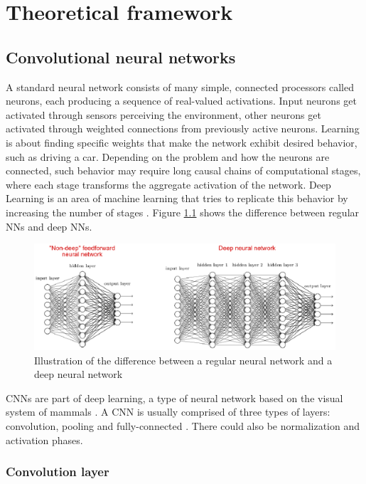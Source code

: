 \chapter{Theoretical framework}
\label{ch:marco}

\section{Convolutional neural networks}

A standard neural network consists of many simple, connected processors called neurons,
each producing a sequence of real-valued activations. Input neurons get activated through 
sensors perceiving the environment, other neurons get activated through weighted connections from previously
active neurons.
Learning is about finding specific weights that make the network exhibit desired behavior,
such as driving a car. Depending on the problem and how the neurons are connected, such behavior
may require long causal chains of computational stages, where each stage transforms 
the aggregate activation of the network. Deep Learning is an area of machine learning that tries to
replicate this behavior by increasing the number of stages \cite{schmidhuber2015deep}.
Figure \ref{fig:nnvscnn} shows the difference between regular NNs and deep NNs.

\begin{figure}
  \includegraphics[width=\linewidth]{fig/nnvscnn.eps}
  \caption{Illustration of the difference between a regular neural network and a deep neural network \cite{nielsen2015neural}}
  \label{fig:nnvscnn}
\end{figure}

CNNs are part of deep learning, a type of neural network based on the 
visual system of mammals \cite{fukushima1980neocognitron}\cite{hubel1968receptive}.
A CNN is usually comprised of three types of layers: convolution, pooling and 
fully-connected \cite{karpathy2016cs231n}. There could also be normalization and activation phases.

\subsection{Convolution layer}

